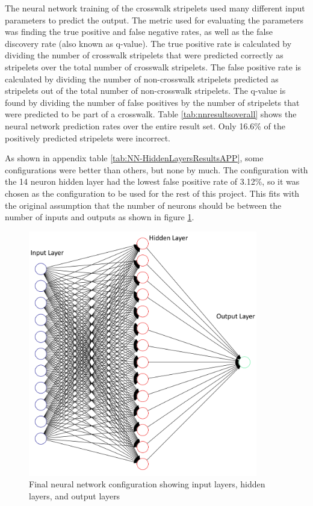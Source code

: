 The neural network training of the crosswalk stripelets used many different input parameters to predict the output. The metric used for evaluating the parameters was finding the true positive and false negative rates, as well as the false discovery rate (also known as q-value). The true positive rate is calculated by dividing the number of crosswalk stripelets that were predicted correctly as stripelets over the total number of crosswalk stripelets. The false positive rate is calculated by dividing the number of non-crosswalk stripelets predicted as stripelets out of the total number of non-crosswalk stripelets. The q-value is found by dividing the number of false positives by the number of stripelets that were predicted to be part of a crosswalk. Table \ref{tab:nnresultsoverall} shows the neural network prediction rates over the entire result set. Only 16.6\% of the positively predicted stripelets were incorrect. 


As shown in appendix table \ref{tab:NN-HiddenLayersResultsAPP}, some configurations were better than others, but none by much. The configuration with the 14 neuron hidden layer had the lowest false positive rate of 3.12\%, so it was chosen as the configuration to be used for the rest of this project. This fits with the original assumption that the number of neurons should be between the number of inputs and outputs as shown in figure \ref{fig:Neural1png}. 

\begin{figure}[t]
\begin{center}
\includegraphics[width=10cm]{figures/ChosenNN3Small.png}
\captionfonts
\caption{Final neural network configuration showing input layers, hidden layers, and output layers}
\label{fig:Neural1png}
\end{center}
\end{figure}

